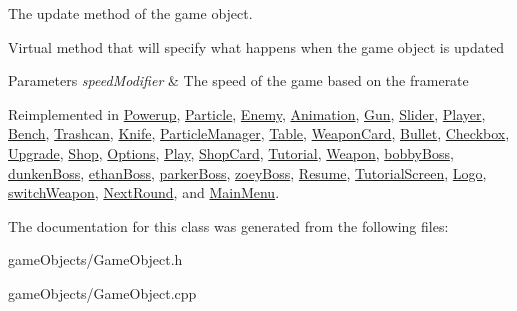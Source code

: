 The update method of the game object. 

Virtual method that will specify what happens when the game object is updated 
\begin{DoxyParams}{Parameters}
{\em speed\+Modifier} & The speed of the game based on the framerate \\
\hline
\end{DoxyParams}


Reimplemented in \hyperlink{class_powerup_a9e2f40a979bbc15787a607871b6644ce}{Powerup}, \hyperlink{class_particle_a9bd18a091946b1814f685118dfe66a1e}{Particle}, \hyperlink{class_enemy_a5509b06f70a649c4ea9d1fb06f07cb5c}{Enemy}, \hyperlink{class_animation_ae17ebf5f4b47801e460eb63342d858e8}{Animation}, \hyperlink{class_gun_ae7cbc34b103c1e89b4536309582dafb5}{Gun}, \hyperlink{class_slider_a762b3a7ca00a3a665a1aeceba2e54fac}{Slider}, \hyperlink{class_player_a70e7b6ef62c5b8080e454edcb15cacc8}{Player}, \hyperlink{class_bench_abb815aa9afeee6e72fa93db3d51cf1a1}{Bench}, \hyperlink{class_trashcan_a6d44d844ec5c4155158b4e4d5fc222a4}{Trashcan}, \hyperlink{class_knife_ac861c5829858e00f82cbfdddb4a7d0b4}{Knife}, \hyperlink{class_particle_manager_a2c786926fc1cd9992c518b3ea4ee07cb}{Particle\+Manager}, \hyperlink{class_table_af37e903447fa51718b7ad49dd2d4dbc3}{Table}, \hyperlink{class_weapon_card_a160dc14db9e74b67537e74fcbf0a6e75}{Weapon\+Card}, \hyperlink{class_bullet_acfcfcf7146d04ad78520292c55ca6eee}{Bullet}, \hyperlink{class_checkbox_af8103187e6df3f44b010a098d7473b55}{Checkbox}, \hyperlink{class_upgrade_a66b04bde03bdf6ad0935b98963619444}{Upgrade}, \hyperlink{class_shop_a80125375c97c1028281e9458885ac0f0}{Shop}, \hyperlink{class_options_aa331e18456d83724b67f94a0827118c4}{Options}, \hyperlink{class_play_ae8b65105669a71c09901aae7b7e6f764}{Play}, \hyperlink{class_shop_card_a3f71274bdfc6c739969439975a3f0711}{Shop\+Card}, \hyperlink{class_tutorial_aeaa7fe8ebcd65dc23ca2df5c73ba5a48}{Tutorial}, \hyperlink{class_weapon_a098b1074ff1099e9fbd83d1186b8f18f}{Weapon}, \hyperlink{classbobby_boss_a1ba19c55017f2fb3f0b1679d82095d78}{bobby\+Boss}, \hyperlink{classdunken_boss_ad9ae91ab3ce0b97ee48ab90203c7e4fd}{dunken\+Boss}, \hyperlink{classethan_boss_a6e47b12c5e718ecee5d888bcde580c1a}{ethan\+Boss}, \hyperlink{classparker_boss_a5f82194f8880924981fccd4bf611f324}{parker\+Boss}, \hyperlink{classzoey_boss_aa712b8f9050e3851cb0133927acd3f54}{zoey\+Boss}, \hyperlink{class_resume_a79207ae2fa394f8a2d0754fef119854d}{Resume}, \hyperlink{class_tutorial_screen_a67f9d997c5702c3ee032d7070d6363ec}{Tutorial\+Screen}, \hyperlink{class_logo_a3c7f6eb9479e2594652d2a2f60c77e21}{Logo}, \hyperlink{classswitch_weapon_a63fe71ba783dce920b6180efb2258735}{switch\+Weapon}, \hyperlink{class_next_round_ab6c2cb6a601f19c9898f962973c765c2}{Next\+Round}, and \hyperlink{class_main_menu_a41b86746c468d18532123dfda01425de}{Main\+Menu}.



The documentation for this class was generated from the following files\+:\begin{DoxyCompactItemize}
\item 
game\+Objects/Game\+Object.\+h\item 
game\+Objects/Game\+Object.\+cpp\end{DoxyCompactItemize}
